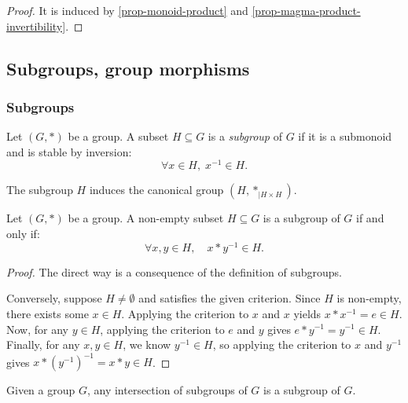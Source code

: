 \documentclass[12pt]{report}
\begin{document}
\begin{proof}
    It is induced by \ref{prop-monoid-product} and \ref{prop-magma-product-invertibility}.
\end{proof}

\subsection{Subgroups, group morphisms}
\subsubsection{Subgroups}

\begin{definition} \label{def-subgroup}
    Let $(G, \ast)$ be a group. A subset $H \subseteq G$ is a \emph{subgroup} of $G$ if it is a submonoid and is stable by inversion: 
    $$
        \forall x \in H, \; x^{-1} \in H.
    $$
\end{definition}

\begin{remark} \label{rem-group-canonical-subgroup}
    The subgroup $H$ induces the canonical group $(H, \ast_{\vert H \times H})$.
\end{remark}

\begin{proposition} \label{prop-subgroup-criterion}
    Let $(G, \ast)$ be a group. A non-empty subset $H \subseteq G$ is a subgroup of $G$ if and only if:
    \[
        \forall x, y \in H, \quad x \ast y^{-1} \in H.
    \]
\end{proposition}

\begin{proof}
    The direct way is a consequence of the definition of subgroups.

    Conversely, suppose $H \neq \emptyset$ and satisfies the given criterion. Since $H$ is non-empty, there exists some $x \in H$. Applying the criterion to $x$ and $x$ yields $x \ast x^{-1} = e \in H$. Now, for any $y \in H$, applying the criterion to $e$ and $y$ gives $e \ast y^{-1} = y^{-1} \in H$. Finally, for any $x, y \in H$, we know $y^{-1} \in H$, so applying the criterion to $x$ and $y^{-1}$ gives $x \ast (y^{-1})^{-1} = x \ast y \in H$.
\end{proof}

\begin{proposition} \label{prop-group-subgroups-intersection}
    Given a group $G$, any intersection of subgroups of $G$ is a subgroup of $G$.
\end{proposition}
\end{document}
